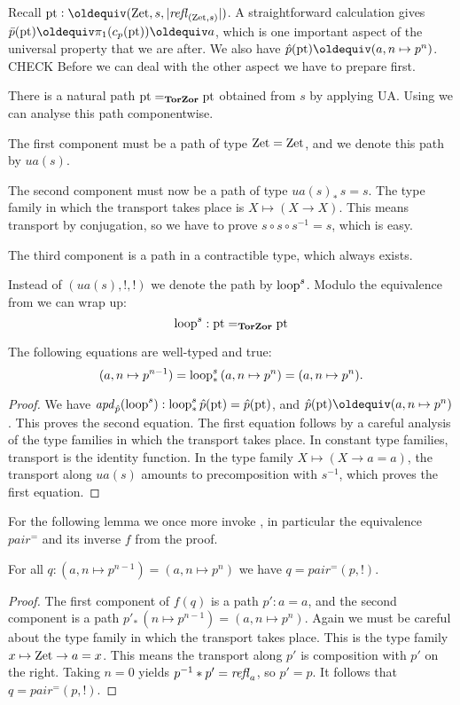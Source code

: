 \documentclass[a4,12pt]{amsart}
\begin{document}
Recall $\pt\defeq (\zet,s,\trunc{\refl{(\zet,s)}})$.
A straightforward calculation gives 
$\bar{p}(\pt)\jdeq \pi_1 (c_p(\pt)) \jdeq a$, which is one important
aspect of the universal property that we are after.
We also have $\hat{p}(\pt)\jdeq (a,n\mapsto p^n)$. CHECK
Before we can deal with the other aspect we have to prepare first.

There is a natural path ${\mathord{\mathrm{pt}}} =_{\mathbf{TorZor}} {\mathord{\mathrm{pt}}}$ obtained from $s$
by applying UA.
Using \cite[Theorem 2.7.2]{hottbook} we can analyse this path
componentwise. 

The first component must be a path of type $\mathrm{Zet}=\mathrm{Zet}$,
and we denote this path by $ua(s)$. 

The second component must now be
a path of type $ua(s)_*\, s = s$. The type family in which the transport
takes place is $X\mapsto (X\to X)$. This means transport by conjugation,
so we have to prove $s\circ s \circ s^{-1} = s$, which is easy.

The third component is a path in a contractible type, which always exists.

Instead of $(ua(s),!,!)$ we denote the path by $\mathrm{loop}^s$.
Modulo the equivalence from \cite[Theorem 2.7.2]{hottbook} we can wrap up:
\[
\mathrm{loop}^s : {\mathord{\mathrm{pt}}} =_{\mathbf{TorZor}} {\mathord{\mathrm{pt}}}
\]

\begin{lemma}\label{lem:TBN}
The following equations are well-typed and true:
\[
(a,n\mapsto p^{n-1}) = \mathrm{loop}^s_*\, (a,n\mapsto p^n) = (a,n\mapsto p^n).
\]
\end{lemma}
\begin{proof}
We have $\mathop{{\it apd}_{\hat{p}}}(\mathrm{loop}^s) : \mathrm{loop}^s_*\,\hat{p}({\mathord{\mathrm{pt}}}) = \hat{p}({\mathord{\mathrm{pt}}})$,
and $\hat{p}(\pt) \jdeq (a,n\mapsto p^n)$. This proves the second equation.
The first equation follows by a careful analysis of the type families
in which the transport takes place. In constant type families, transport
is the identity function. In the type family $X\mapsto (X\to a=a)$,
the transport along $ua(s)$ amounts to precomposition with $s^{-1}$,
which proves the first equation.
\end{proof}

For the following lemma we once more 
invoke \cite[Theorem 2.7.2]{hottbook}, in particular
the equivalence $pair^=$ and its inverse $f$ from the proof.

\begin{lemma}\label{lem:TBN}
For all $q:(a,n\mapsto p^{n-1}) = (a,n\mapsto p^n)$ we have $q=pair^=(p,!)$.
\end{lemma}
\begin{proof}
The first component of $f(q)$ is a path $p':a=a$,
and the second component is a path 
$p'_*\, (n\mapsto p^{n-1}) = (a,n\mapsto p^n)$.
Again we must be careful about the type family in which the
transport takes place. This is the type
family $x\mapsto \mathrm{Zet}\to a=x$. 
This means the transport along $p'$ is composition with $p'$ on the right.
Taking $n=0$ yields $p^{-1}* p' = \mathop{{\it refl}_{a}}$, so $p'=p$.
It follows that $q=pair^=(p,!)$.
\end{proof}
\end{document}
